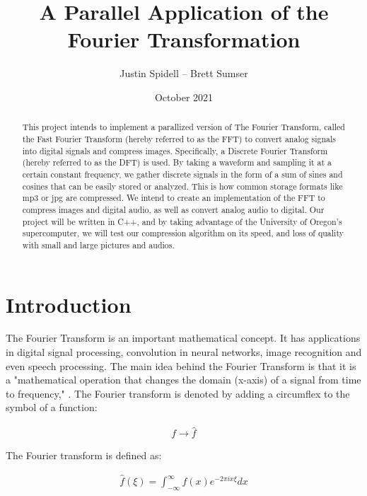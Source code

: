 \documentclass[12pt]{extarticle}
\title{A Parallel Application of the Fourier Transformation}
\author{Justin Spidell -- Brett Sumser}
\date{October 2021}
\begin{document}
 
\maketitle
\newpage
\begin{abstract}

	This project intends to implement a parallized version of The Fourier Transform, called the Fast Fourier Transform (hereby referred to as the FFT) to convert analog signals into digital signals and compress images. 
	Specifically, a Discrete Fourier Transform (hereby referred to as the DFT) is used.
	By taking a waveform and sampling it at a certain constant frequency, we gather discrete signals in the form of a sum of sines and cosines that can be easily stored or analyzed.
	This is how common storage formats like mp3 or jpg are compressed.
	\newline
    \indent We intend to create an implementation of the FFT to compress images and digital audio, as well as convert analog audio to digital. 
    Our project will be written in C++, and by taking advantage of the University of Oregon's supercomputer, we will test our compression algorithm on its speed, and loss of quality with small and large pictures and audios.

\end{abstract}


\maketitle
\newpage
\section*{Introduction}

	The Fourier Transform is an important mathematical concept. It has applications
    in digital signal processing, convolution in neural networks, image recognition and even speech processing.
    The main idea behind the Fourier Transform is that it is a 
    "mathematical operation that changes the domain (x-axis) of a signal from time to frequency," \cite{Maklin:2019}. 
    The Fourier transform is denoted by adding a circumflex to the symbol of a function:

	\begin{align*}
		f \rightarrow \hat{f}
	\end{align*}

	The Fourier transform is defined as:

	\begin{align}
		\hat{f} (\xi)= \int^{\infty}_{-\infty}f(x) e^{-2 \pi i x \xi}dx
	\end{align}
\end{document}
